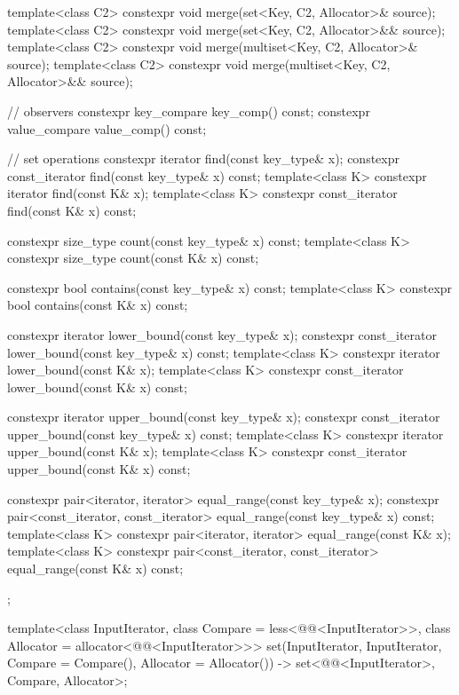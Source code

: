 \begin{codeblock}
{{    template<class C2>
      constexpr void merge(set<Key, C2, Allocator>& source);
    template<class C2>
      constexpr void merge(set<Key, C2, Allocator>&& source);
    template<class C2>
      constexpr void merge(multiset<Key, C2, Allocator>& source);
    template<class C2>
      constexpr void merge(multiset<Key, C2, Allocator>&& source);

    // observers
    constexpr key_compare key_comp() const;
    constexpr value_compare value_comp() const;

    // set operations
    constexpr iterator       find(const key_type& x);
    constexpr const_iterator find(const key_type& x) const;
    template<class K> constexpr iterator       find(const K& x);
    template<class K> constexpr const_iterator find(const K& x) const;

    constexpr size_type      count(const key_type& x) const;
    template<class K> constexpr size_type count(const K& x) const;

    constexpr bool           contains(const key_type& x) const;
    template<class K> constexpr bool contains(const K& x) const;

    constexpr iterator       lower_bound(const key_type& x);
    constexpr const_iterator lower_bound(const key_type& x) const;
    template<class K> constexpr iterator       lower_bound(const K& x);
    template<class K> constexpr const_iterator lower_bound(const K& x) const;

    constexpr iterator       upper_bound(const key_type& x);
    constexpr const_iterator upper_bound(const key_type& x) const;
    template<class K> constexpr iterator       upper_bound(const K& x);
    template<class K> constexpr const_iterator upper_bound(const K& x) const;

    constexpr pair<iterator, iterator>               equal_range(const key_type& x);
    constexpr pair<const_iterator, const_iterator>   equal_range(const key_type& x) const;
    template<class K>
      constexpr pair<iterator, iterator>             equal_range(const K& x);
    template<class K>
      constexpr pair<const_iterator, const_iterator> equal_range(const K& x) const;
  };

  template<class InputIterator,
           class Compare = less<@@<InputIterator>>,
           class Allocator = allocator<@@<InputIterator>>>
    set(InputIterator, InputIterator,
        Compare = Compare(), Allocator = Allocator())
      -> set<@@<InputIterator>, Compare, Allocator>;

}
\end{codeblock}
